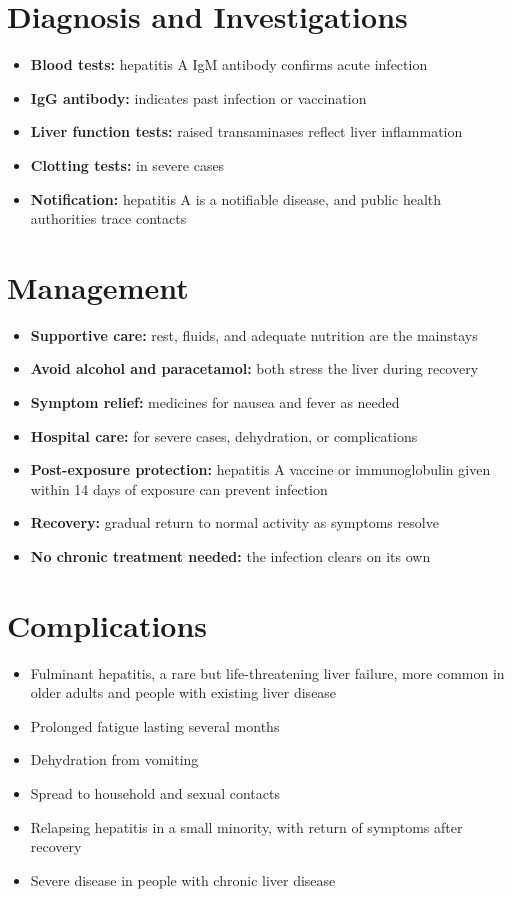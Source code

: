 \section*{Diagnosis and Investigations}
\begin{itemize}
    \item \textbf{Blood tests:} hepatitis A IgM antibody confirms acute infection
    \item \textbf{IgG antibody:} indicates past infection or vaccination
    \item \textbf{Liver function tests:} raised transaminases reflect liver inflammation
    \item \textbf{Clotting tests:} in severe cases
    \item \textbf{Notification:} hepatitis A is a notifiable disease, and public health authorities trace contacts
\end{itemize}

\section*{Management}
\begin{itemize}
    \item \textbf{Supportive care:} rest, fluids, and adequate nutrition are the mainstays
    \item \textbf{Avoid alcohol and paracetamol:} both stress the liver during recovery
    \item \textbf{Symptom relief:} medicines for nausea and fever as needed
    \item \textbf{Hospital care:} for severe cases, dehydration, or complications
    \item \textbf{Post-exposure protection:} hepatitis A vaccine or immunoglobulin given within 14 days of exposure can prevent infection
    \item \textbf{Recovery:} gradual return to normal activity as symptoms resolve
    \item \textbf{No chronic treatment needed:} the infection clears on its own
\end{itemize}

\section*{Complications}
\begin{itemize}
    \item Fulminant hepatitis, a rare but life-threatening liver failure, more common in older adults and people with existing liver disease
    \item Prolonged fatigue lasting several months
    \item Dehydration from vomiting
    \item Spread to household and sexual contacts
    \item Relapsing hepatitis in a small minority, with return of symptoms after recovery
    \item Severe disease in people with chronic liver disease
\end{itemize}

